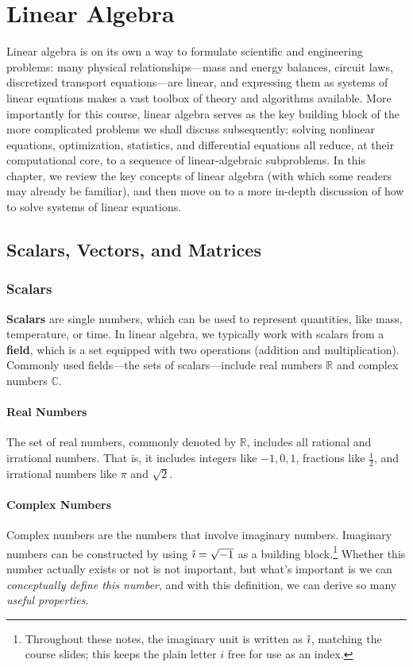 \chapter{Linear Algebra}
Linear algebra is on its own a way to formulate scientific and engineering problems: many physical relationships---mass and energy balances, circuit laws, discretized transport equations---are linear, and expressing them as systems of linear equations makes a vast toolbox of theory and algorithms available.
More importantly for this course, linear algebra serves as the key building block of the more complicated problems we shall discuss subsequently: solving nonlinear equations, optimization, statistics, and differential equations all reduce, at their computational core, to a sequence of linear-algebraic subproblems.
In this chapter, we review the key concepts of linear algebra (with which some readers may already be familiar), and then move on to a more in-depth discussion of how to solve systems of linear equations.

\section{Scalars, Vectors, and Matrices}
\subsection{Scalars}
\textbf{Scalars} are single numbers, which can be used to represent quantities, like mass, temperature, or time. In linear algebra, we typically work with scalars from a \textbf{field}, which is a set equipped with two operations (addition and multiplication). Commonly used fields---the sets of scalars---include real numbers $ \mathbb{R} $ and complex numbers $ \mathbb{C} $.

\subsubsection*{Real Numbers}
The set of real numbers, commonly denoted by $ \mathbb{R} $, includes all rational and irrational numbers.
That is, it includes integers like $-1, 0, 1$, fractions like $ \frac{1}{2} $, and irrational numbers like $ \pi $ and $ \sqrt{2} $.


\subsubsection*{Complex Numbers}
Complex numbers are the numbers that involve imaginary numbers.
Imaginary numbers can be constructed by using $\hat{\imath}=\sqrt{-1}$ as a building block.\footnote{Throughout these notes, the imaginary unit is written as $\hat{\imath}$, matching the course slides; this keeps the plain letter $i$ free for use as an index.}
Whether this number actually exists or not is not important, but what's important is we can \emph{conceptually define this number}, and with this definition, we can derive so many \emph{useful properties}.


